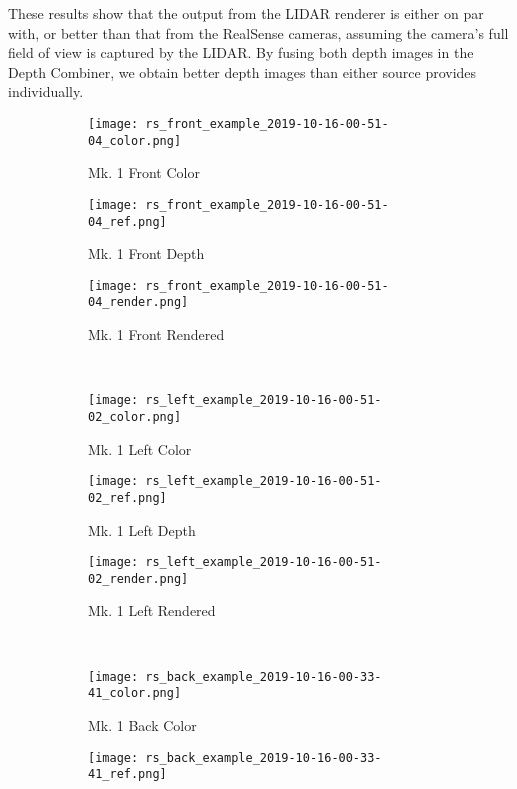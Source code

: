 These results show that the output from the LIDAR renderer is either on par with, or better than that from the RealSense cameras, assuming the camera's full field of view is captured by the LIDAR. By fusing both depth images in the Depth Combiner, we obtain better depth images than either source provides individually.

\begin{figure}
	\centering
	\begin{subfigure}{0.32\textwidth}
		\texttt{[image: rs\_front\_example\_2019-10-16-00-51-04\_color.png]}
		\caption{Mk. 1 Front Color}
		\label{lidar_front_color}
	\end{subfigure}		
	\hfill
	\begin{subfigure}{0.32\textwidth}
		\texttt{[image: rs\_front\_example\_2019-10-16-00-51-04\_ref.png]}
		\caption{Mk. 1 Front Depth}
		\label{lidar_front_ref}		
	\end{subfigure}
	\hfill
	\begin{subfigure}{0.32\textwidth}
		\texttt{[image: rs\_front\_example\_2019-10-16-00-51-04\_render.png]}
		\caption{Mk. 1 Front Rendered}
		\label{lidar_front_render}
	\end{subfigure}
	\\
	\begin{subfigure}{0.32\textwidth}
		\texttt{[image: rs\_left\_example\_2019-10-16-00-51-02\_color.png]}
		\caption{Mk. 1 Left Color}
		\label{lidar_left_color}
	\end{subfigure}		
	\hfill
	\begin{subfigure}{0.32\textwidth}
		\texttt{[image: rs\_left\_example\_2019-10-16-00-51-02\_ref.png]}
		\caption{Mk. 1 Left Depth}
		\label{lidar_left_ref}		
	\end{subfigure}
	\hfill
	\begin{subfigure}{0.32\textwidth}
		\texttt{[image: rs\_left\_example\_2019-10-16-00-51-02\_render.png]}
		\caption{Mk. 1 Left Rendered}
		\label{lidar_left_render}
	\end{subfigure}
	\\
	\begin{subfigure}{0.32\textwidth}
		\texttt{[image: rs\_back\_example\_2019-10-16-00-33-41\_color.png]}
		\caption{Mk. 1 Back Color}
		\label{lidar_back_color}
	\end{subfigure}		
	\hfill
	\begin{subfigure}{0.32\textwidth}
		\texttt{[image: rs\_back\_example\_2019-10-16-00-33-41\_ref.png]}

\end{subfigure}
\end{figure}
